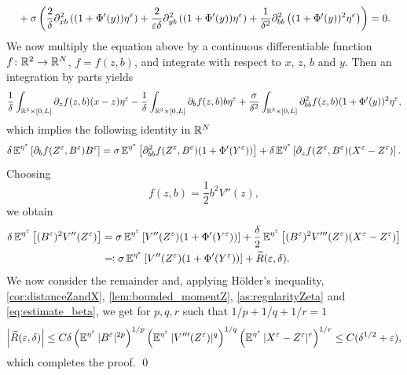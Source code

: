\documentclass[review,onefignum,onetabnum]{siamonline190516}
\begin{document}
\begin{appendices}
\begin{equation}
\begin{aligned}
	&\quad + \sigma \left( \frac2\delta \partial_{xb}^2 \left( (1+\Phi'(y)) \eta^\varepsilon \right) + \frac2{\varepsilon\delta}\partial_{yb}^2 \left( (1+\Phi'(y))\eta^\varepsilon \right) + \frac1{\delta^2}\partial_{bb}^2 \left( (1+\Phi'(y))^2 \eta^\varepsilon \right) \right) = 0.
	\end{aligned}
	\end{equation}
	We now multiply the equation above by a continuous differentiable function $f \colon \mathbb{R}^2 \to \mathbb{R}^N$, $f = f(z,b)$, and integrate with respect to $x$, $z$, $b$ and $y$. Then an integration by parts yields
	\begin{equation}
	\frac1\delta \int_{\mathbb{R}^3 \times [0,L]} \partial_z f(z,b) (x-z) \eta^\varepsilon - \frac1\delta \int_{\mathbb{R}^3 \times [0,L]} \partial_b f(z,b) b \eta^\varepsilon + \frac{\sigma}{\delta^2} \int_{\mathbb{R}^3 \times [0,L]} \partial_{bb}^2 f(z,b) (1+\Phi'(y))^2 \eta^\varepsilon,
	\end{equation}
	which implies the following identity in $\mathbb{R}^N$
	\begin{equation}
	\delta \operatorname{\mathbb{E}}^{\eta^\varepsilon}\left[ \partial_b f(Z^\varepsilon, B^\varepsilon) B^\varepsilon \right] = \sigma \operatorname{\mathbb{E}}^{\eta^\varepsilon} \left[ \partial_{bb}^2 f(Z^\varepsilon, B^\varepsilon) (1+\Phi'(Y^\varepsilon)) \right] + \delta \operatorname{\mathbb{E}}^{\eta^\varepsilon} \left[ \partial_z f(Z^\varepsilon, B^\varepsilon) (X^\varepsilon-Z^\varepsilon) \right].
	\end{equation}
	Choosing
	\begin{equation}
	f(z,b) = \frac12 b^2 V''(z),
	\end{equation}
	we obtain
	\begin{equation}
	\begin{aligned}
	\delta \operatorname{\mathbb{E}}^{\eta^\varepsilon}\left[ (B^\varepsilon)^2 V''(Z^\varepsilon) \right] &= \sigma \operatorname{\mathbb{E}}^{\eta^\varepsilon} \left[ V''(Z^\varepsilon) (1+\Phi'(Y^\varepsilon)) \right] + \frac\delta2 \operatorname{\mathbb{E}}^{\eta^\varepsilon} \left[ (B^\varepsilon)^2 V'''(Z^\varepsilon) (X^\varepsilon-Z^\varepsilon) \right] \\
	&\eqqcolon \sigma \operatorname{\mathbb{E}}^{\eta^\varepsilon} \left[ V''(Z^\varepsilon) (1+\Phi'(Y^\varepsilon)) \right] + \widetilde R(\varepsilon,\delta).
	\end{aligned}
	\end{equation}
	We now consider the remainder and, applying Hölder's inequality, \cref{cor:distanceZandX}, \cref{lem:bounded_momentZ}, \cref{as:regularityZeta} and \eqref{eq:estimate_beta}, we get for $p,q,r$ such that $1/p+1/q+1/r=1$
	\begin{equation}
	\left| \widetilde R(\varepsilon,\delta) \right| \le C \delta \left( \operatorname{\mathbb{E}}^{\eta^\varepsilon} |B^\varepsilon|^{2p} \right)^{1/p} \left( \operatorname{\mathbb{E}}^{\eta^\varepsilon} |V'''(Z^\varepsilon)|^q \right)^{1/q} \left( \operatorname{\mathbb{E}}^{\eta^\varepsilon} |X^\varepsilon - Z^\varepsilon|^r \right)^{1/r} \le C (\delta^{1/2} + \varepsilon),
	\end{equation}
	which completes the proof. \qed 


\end{appendices}
\end{document}
